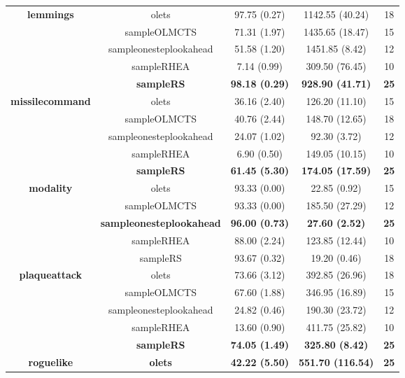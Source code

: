 \begin{table*}[!t]
\begin{center}
\begin{adjustbox}{width=1\textwidth}
\begin{tabular}{|c|c|c|c|c|}
 \\
\hline
\hline
\cline{2-5}
\multirow{5}{*}{\textbf{lemmings}} & olets & 97.75 (0.27) & 1142.55 (40.24) & 18
 \\
\cline{2-5}
 & sampleOLMCTS & 71.31 (1.97) & 1435.65 (18.47) & 15
 \\
\cline{2-5}
 & sampleonesteplookahead & 51.58 (1.20) & 1451.85 (8.42) & 12
 \\
\cline{2-5}
 & sampleRHEA & 7.14 (0.99) & 309.50 (76.45) & 10
 \\
\cline{2-5}
 & \textbf{sampleRS} & \textbf{98.18 (0.29)} & \textbf{928.90 (41.71)} & \textbf{25}
 \\
\hline
\hline
\cline{2-5}
\multirow{5}{*}{\textbf{missilecommand}} & olets & 36.16 (2.40) & 126.20 (11.10) & 15
 \\
\cline{2-5}
 & sampleOLMCTS & 40.76 (2.44) & 148.70 (12.65) & 18
 \\
\cline{2-5}
 & sampleonesteplookahead & 24.07 (1.02) & 92.30 (3.72) & 12
 \\
\cline{2-5}
 & sampleRHEA & 6.90 (0.50) & 149.05 (10.15) & 10
 \\
\cline{2-5}
 & \textbf{sampleRS} & \textbf{61.45 (5.30)} & \textbf{174.05 (17.59)} & \textbf{25}
 \\
\hline
\hline
\cline{2-5}
\multirow{5}{*}{\textbf{modality}} & olets & 93.33 (0.00) & 22.85 (0.92) & 15
 \\
\cline{2-5}
 & sampleOLMCTS & 93.33 (0.00) & 185.50 (27.29) & 12
 \\
\cline{2-5}
 & \textbf{sampleonesteplookahead} & \textbf{96.00 (0.73)} & \textbf{27.60 (2.52)} & \textbf{25}
 \\
\cline{2-5}
 & sampleRHEA & 88.00 (2.24) & 123.85 (12.44) & 10
 \\
\cline{2-5}
 & sampleRS & 93.67 (0.32) & 19.20 (0.46) & 18
 \\
\hline
\hline
\cline{2-5}
\multirow{5}{*}{\textbf{plaqueattack}} & olets & 73.66 (3.12) & 392.85 (26.96) & 18
 \\
\cline{2-5}
 & sampleOLMCTS & 67.60 (1.88) & 346.95 (16.89) & 15
 \\
\cline{2-5}
 & sampleonesteplookahead & 24.82 (0.46) & 190.30 (23.72) & 12
 \\
\cline{2-5}
 & sampleRHEA & 13.60 (0.90) & 411.75 (25.82) & 10
 \\
\cline{2-5}
 & \textbf{sampleRS} & \textbf{74.05 (1.49)} & \textbf{325.80 (8.42)} & \textbf{25}
 \\
\hline
\hline
\cline{2-5}
\multirow{5}{*}{\textbf{roguelike}} & \textbf{olets} & \textbf{42.22 (5.50)} & \textbf{551.70 (116.54)} & \textbf{25}

\end{tabular}
\end{adjustbox}
\end{center}
\end{table*}
